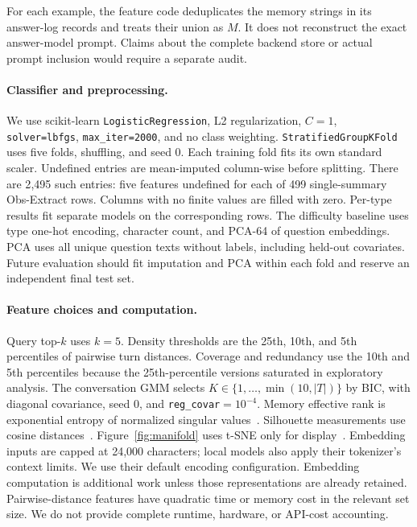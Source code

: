 \documentclass{article}
\begin{document}
For each example, the feature code deduplicates the memory strings in its
answer-log records and treats their union as $M$. It does not reconstruct the
exact answer-model prompt. Claims about the complete backend store or actual
prompt inclusion would require a separate audit.

\paragraph{Classifier and preprocessing.}
We use scikit-learn \texttt{LogisticRegression}, L2 regularization,
$C=1$, \texttt{solver=lbfgs}, \texttt{max\_iter=2000}, and no class weighting.
\texttt{StratifiedGroupKFold} uses five folds, shuffling, and seed 0.
Each training fold fits its own standard scaler.
Undefined entries are mean-imputed column-wise before splitting.
There are 2{,}495 such entries: five features undefined for each of
499 single-summary Obs-Extract rows.
Columns with no finite values are filled with zero.
Per-type results fit separate models on the corresponding rows.
The difficulty baseline uses type one-hot encoding, character count,
and PCA-64 of question embeddings. PCA uses all unique question texts
without labels, including held-out covariates.
Future evaluation should fit imputation and PCA within each fold and
reserve an independent final test set.

\paragraph{Feature choices and computation.}
Query top-$k$ uses $k=5$.
Density thresholds are the 25th, 10th, and 5th percentiles of pairwise turn distances.
Coverage and redundancy use the 10th and 5th percentiles because the
25th-percentile versions saturated in exploratory analysis.
The conversation GMM selects $K\in\{1,\ldots,\min(10,|T|)\}$ by BIC,
with diagonal covariance, seed 0, and \texttt{reg\_covar}$=10^{-4}$.
Memory effective rank is exponential entropy of normalized singular
values~\citep{roy2007effective}.
Silhouette measurements use cosine distances~\citep{rousseeuw1987silhouettes}.
Figure~\ref{fig:manifold} uses t-SNE only for display~\citep{vandermaaten2008tsne}.
Embedding inputs are capped at 24{,}000 characters; local models also apply
their tokenizer's context limits. We use their default encoding configuration.
Embedding computation is additional work unless those representations are
already retained. Pairwise-distance features have quadratic time or memory
cost in the relevant set size.
We do not provide complete runtime, hardware, or API-cost accounting.
\end{document}
